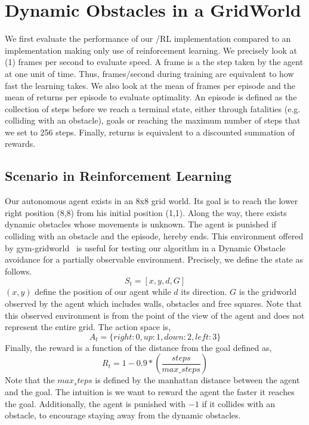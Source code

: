 \section{Dynamic Obstacles in a GridWorld} 
\label{gridworlddyn}
We first evaluate the performance of our \dio{}/RL implementation compared to an implementation making only use of reinforcement learning. 
We precisely look at (1) frames per second to evaluate speed. A \gls{frame} is a the step taken by the agent at one unit of time. Thus, frames/second 
during training are equivalent to how fast the learning takes. We also look at the mean of frames per episode and the mean of returns per episode to evaluate 
optimality. An \gls{episode} is defined as the collection of steps before we reach a terminal state, either 
through fatalities (e.g. colliding with an obstacle), goals or reaching the maximum number of steps that we set to 256 steps.
Finally, \glspl{return} is equivalent to a discounted summation of rewards. 
\subsection{Scenario in Reinforcement Learning}

Our autonomous agent exists in an 8x8 grid world. Its goal is to reach
the lower right position (8,8) from his initial position (1,1).
Along the way, there exists dynamic obstacles whose movements is
unknown. The agent is punished if colliding with an obstacle and the
\gls{episode}, hereby ends. 
This environment offered by gym-gridworld~\cite{gym_minigrid} is useful for testing our algorithm in a Dynamic Obstacle avoidance for a partially observable 
environment. Precisely, we define the state as follows. 
\begin{equation*}
  S_t = [x, y, d, G]
\end{equation*}
$(x,y)$ define the position of our agent while $d$ its direction. $G$
is the gridworld observed by the agent which includes walls, obstacles
and free squares. Note that this observed environment is from the point of the view 
of the agent and does not represent the entire grid. 
The action space is, 
\begin{equation*}
  A_t = \{ right: 0, up: 1, down: 2, left: 3 \}
\end{equation*}
Finally, the reward is a function of the distance from the goal
defined as, 
\begin{equation*}
  R_t = 1 - 0.9*(\dfrac{steps}{max\_steps})
\end{equation*}
Note that the $max_steps$ is defined by the manhattan distance between the agent and the goal. The intuition is 
we want to reward the agent the faster it reaches the goal. Additionally, the agent is punished with $-1$ if it collides with 
an obstacle, to encourage staying away from the dynamic obstacles. 

